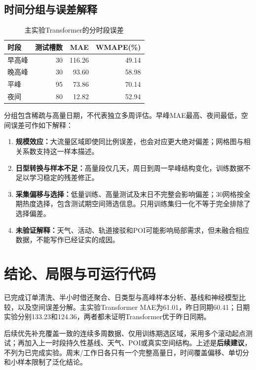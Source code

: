 \documentclass[11pt]{ctexart}
\begin{document}
\subsection{时间分组与误差解释}
\begin{table}[H]\centering\small\caption{主实验Transformer的分时段误差}
\begin{tabular}{lrrr}\toprule
时段 & 测试槽数 & MAE & WMAPE(\%)\\\midrule
早高峰 & 30 & 116.26 & 49.14\\
晚高峰 & 30 & 93.60 & 58.98\\
平峰 & 95 & 73.86 & 70.14\\
夜间 & 80 & 12.82 & 52.94\\\bottomrule
\end{tabular}\end{table}
分组包含稀疏与高量日期，不代表独立多周评估。早峰MAE最高、夜间最低，空间误差可作如下解释：
\begin{enumerate}
\item \textbf{规模效应：}大流量区域即使同比例误差，也会对应更大绝对偏差；网格图与相关系数支持这一样本描述。
\item \textbf{日型转换与样本不足：}高量段仅几天，周日到周一早峰结构变化，训练数据不足以学习稳定的残差修正。
\item \textbf{采集偏移与选择：}低量训练、高量测试及末日不完整会影响偏差；30网格按全期热度选择，包含测试期空间筛选信息。只用训练集归一化不等于完全排除了选择偏差。
\item \textbf{未验证解释：}天气、活动、轨道接驳和POI可能影响局部需求，但未融合相应数据，不能写作已经证实的成因。
\end{enumerate}

\section{结论、局限与可运行代码}
已完成订单清洗、半小时借还聚合、日类型与高峰样本分析、基线和神经模型比较，以及空间误差分解。主实验Transformer MAE为61.01，昨日同期60.41；日期实验分别133.23和124.36，两者都未证明Transformer优于昨日同期。

后续优先补充覆盖一致的连续多周数据、仅用训练期选区域，采用多个滚动起点测试；再加入上一时段持久性基线、天气、POI或真实空间结构。上述是\textbf{后续建议}，不列为已完成实验。周末/工作日各只有一个完整高量日，时间覆盖偏移、单切分和小样本限制了泛化结论。
\end{document}
